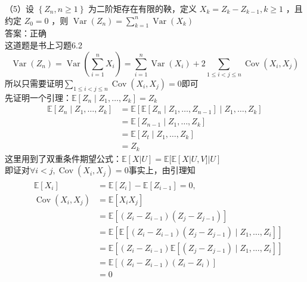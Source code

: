 \documentclass[UTF8]{ctexart}
\begin{document}
\noindent （5）设 $\left\{Z_{n}, n \geq 1\right\}$ 为二阶矩存在有限的鞅，定义 $X_{k}=Z_{k}-Z_{k-1}, k \geq 1$ ，且约定 $Z_{0}=0$ ，则 $\operatorname{Var}\left(Z_{n}\right)=\sum_{k=1}^{n} \operatorname{Var}\left(X_{k}\right)$ \\
答案：正确\\
这道题是书上习题6.2\\
\[
\operatorname{Var}\left(Z_n \right)=\operatorname{Var}(\sum_{i=1}^{n} X_i)=\sum_{i=1}^{n} \operatorname{Var}(X_i)+2\sum\limits_{1 \le i <j \le n }^{} \operatorname{Cov}(X_i,X_j) 
\]
所以只需要证明$\sum\limits_{1 \le i <j \le n }^{} \operatorname{Cov}(X_i,X_j)=0 $即可\\
先证明一个引理：$\mathbb{E}\left[Z_n \mid Z_1, \ldots, Z_k\right] =Z_k$\\
$$
\begin{aligned}
	\mathbb{E}\left[Z_n \mid Z_1, \ldots, Z_k\right] & =\mathbb{E}\left[\mathbb{E}\left[Z_n \mid Z_1, \ldots, Z_{n-1}\right] \mid Z_1, \ldots, Z_k\right] \\
	& =\mathbb{E}\left[Z_{n-1} \mid Z_1, \ldots, Z_k\right] \\
	& =\mathbb{E}\left[Z_t \mid Z_1, \ldots, Z_k\right] \\
	& =Z_k
\end{aligned}
$$
这里用到了双重条件期望公式：$\mathbb{E}[X|U]=\mathbb{E}[\mathbb{E}[X|U,V]|U]$\\
 即证对$\forall i<j, \operatorname{Cov}\left(X_i, X_j\right)=0 $事实上，由引理知\\
$$
\begin{aligned}
	&\begin{aligned}
		\mathbb{E}\left[X_i\right] & =\mathbb{E}\left[Z_i\right]-\mathbb{E}\left[Z_{i-1}\right]=0, \\
		\operatorname{Cov}\left(X_i, X_j\right) & =\mathbb{E}\left[X_i X_j\right] \\
		& =\mathbb{E}\left[\left(Z_i-Z_{i-1}\right)\left(Z_j-Z_{j-1}\right)\right] \\
		& =\mathbb{E}\left[\mathbb{E}\left[\left(Z_i-Z_{i-1}\right)\left(Z_j-Z_{j-1}\right) \mid Z_1, \ldots, Z_i\right]\right] \\
		& =\mathbb{E}\left[\left(Z_i-Z_{i-1}\right) \mathbb{E}\left[\left(Z_j-Z_{j-1}\right) \mid Z_1, \ldots, Z_i\right]\right] \\
		& =\mathbb{E}\left[\left(Z_i-Z_{i-1}\right)\left(Z_i-Z_i\right)\right] \\
		& =0
	\end{aligned}
\end{aligned}
$$\\
\end{document}
